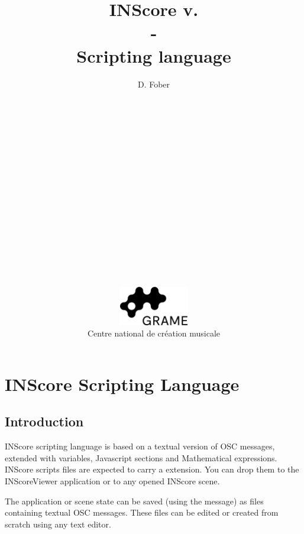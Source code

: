 \documentclass[a4paper,twoside]{report}
\newcommand{\toplevel}[1]	{\chapter{#1}}
\newcommand{\sublevel}[1]	{\section{#1}}
\begin{document}
\title{\vspace*{5cm}INScore v.\inscoreversion \\ - \\ Scripting language}
\author{D. Fober\\ 
\\
\\
\\
\\
\\
\\
\\
\\
\\
\\
\\
\\
\\
\\
\\
\\
\\
\includegraphics[width=30mm]{imgs/Logo_Grame}\\
Centre national de création musicale\\
}
\date{}

\maketitle
\thispagestyle{empty}

\cleardoublepage
\tableofcontents
\thispagestyle{empty}

\pagestyle{mystyle}
\setcounter{page}{1}



\toplevel{INScore Scripting Language}
\label{scripting}

\sublevel{Introduction}
\label{introduction}

INScore scripting language is based on a textual version of OSC messages, extended with variables, Javascript sections and Mathematical expressions.
INScore scripts files are expected to carry a  extension. You can drop them to the INScoreViewer application or to any opened INScore scene.

The application or scene state can be saved (using the  message) as files containing textual OSC messages. These files can be edited or created from scratch using any text editor. 
\end{document}
